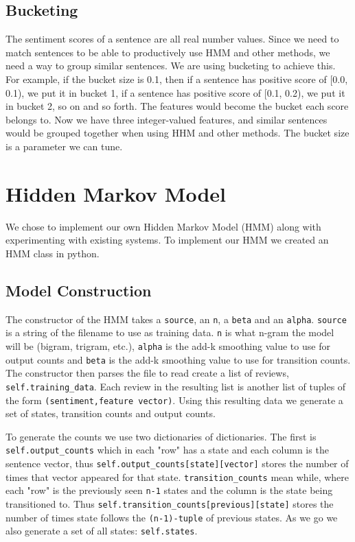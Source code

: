 \documentclass{article}
\begin{document}
\subsection{Bucketing}
The sentiment scores of a sentence are all real number values. Since we need to match sentences to be able to productively use HMM and other methods, we need a way to group similar sentences. We are using bucketing to achieve this. For example, if the bucket size is 0.1, then if a sentence has positive score of [0.0, 0.1), we put it in bucket 1, if a sentence has positive score of [0.1, 0.2), we put it in bucket 2, so on and so forth. The features would become the bucket each score belongs to. Now we have three integer-valued features, and similar sentences would be grouped together when using HHM and other methods. The bucket size is a parameter we can tune.

\section{Hidden Markov Model}

We chose to implement our own Hidden Markov Model (HMM) along with experimenting with existing systems. To implement our HMM we created an HMM class in python.

\subsection{Model Construction}
The constructor of the HMM takes a \texttt{source}, an \texttt{n}, a \texttt{beta} and an \texttt{alpha}. \texttt{source} is a string of the filename to use as training data. \texttt{n} is what n-gram the model will be (bigram, trigram, etc.), \texttt{alpha} is the add-k smoothing value to use for output counts and \texttt{beta} is the add-k smoothing value to use for transition counts. The constructor then parses the file to read create a list of reviews, \texttt{self.training\_data}. Each review in the resulting list is another list of tuples of the form \texttt{(sentiment,feature vector)}. Using this resulting data we generate a set of states, transition counts and output counts.

To generate the counts we use two dictionaries of dictionaries. The first is \texttt{self.output\_counts} which in each "row" has a state and each column is the sentence vector, thus \texttt{self.output\_counts[state][vector]} stores the number of times that vector appeared for that state. \texttt{transition\_counts} mean while, where each "row" is the previously seen \texttt{n-1} states and the column is the state being transitioned to. Thus \texttt{self.transition\_counts[previous][state]} stores the number of times state follows the \texttt{(n-1)-tuple} of previous states. As we go we also generate a set of all states: \texttt{self.states}.
\end{document}
